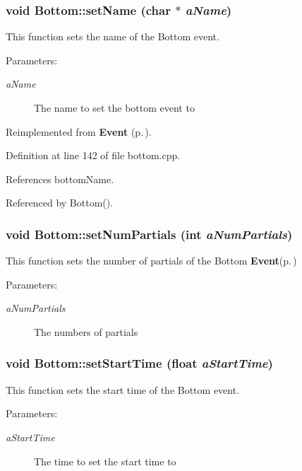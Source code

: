 \subsubsection{\setlength{\rightskip}{0pt plus 5cm}void Bottom::set\-Name (char $\ast$ {\em a\-Name})\hspace{0.3cm}{\tt  [virtual]}}\label{classBottom_a6}


This function sets the name of the Bottom event. \begin{Desc}
\item[Parameters:]
\begin{description}
\item[{\em a\-Name}]The name to set the bottom event to \end{description}
\end{Desc}


Reimplemented from {\bf Event} {\rm (p.\,\pageref{classEvent_a10})}.

Definition at line 142 of file bottom.cpp.

References bottom\-Name.

Referenced by Bottom().
\subsubsection{\setlength{\rightskip}{0pt plus 5cm}void Bottom::set\-Num\-Partials (int {\em a\-Num\-Partials})}\label{classBottom_a10}


This function sets the number of partials of the Bottom {\bf Event}{\rm (p.\,\pageref{classEvent})} \begin{Desc}
\item[Parameters:]
\begin{description}
\item[{\em a\-Num\-Partials}]The numbers of partials \end{description}
\end{Desc}
\subsubsection{\setlength{\rightskip}{0pt plus 5cm}void Bottom::set\-Start\-Time (float {\em a\-Start\-Time})\hspace{0.3cm}{\tt  [virtual]}}\label{classBottom_a7}


This function sets the start time of the Bottom event. \begin{Desc}
\item[Parameters:]
\begin{description}
\item[{\em a\-Start\-Time}]The time to set the start time to \end{description}
\end{Desc}


